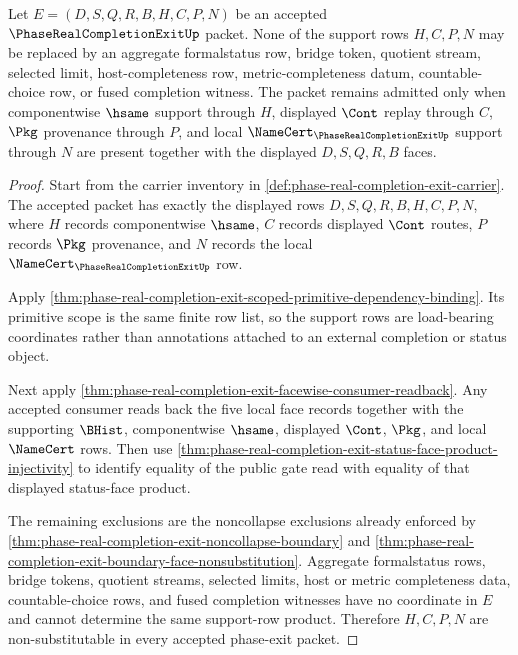 \begin{theorem}
\label{thm:phase-real-completion-exit-support-row-nonsubstitution}
Let $E=(D,S,Q,R,B,H,C,P,N)$ be an accepted $\PhaseRealCompletionExitUp$ packet. None of the support rows $H,C,P,N$ may be replaced by an aggregate formalstatus row, bridge token, quotient stream, selected limit, host-completeness row, metric-completeness datum, countable-choice row, or fused completion witness. The packet remains admitted only when componentwise $\hsame$ support through $H$, displayed $\Cont$ replay through $C$, $\Pkg$ provenance through $P$, and local $\NameCert_{\PhaseRealCompletionExitUp}$ support through $N$ are present together with the displayed $D,S,Q,R,B$ faces.
\end{theorem}
\begin{proof}
Start from the carrier inventory in \autoref{def:phase-real-completion-exit-carrier}. The accepted packet has exactly the displayed rows $D,S,Q,R,B,H,C,P,N$, where $H$ records componentwise $\hsame$, $C$ records displayed $\Cont$ routes, $P$ records $\Pkg$ provenance, and $N$ records the local $\NameCert_{\PhaseRealCompletionExitUp}$ row.

Apply \autoref{thm:phase-real-completion-exit-scoped-primitive-dependency-binding}. Its primitive scope is the same finite row list, so the support rows are load-bearing coordinates rather than annotations attached to an external completion or status object.

Next apply \autoref{thm:phase-real-completion-exit-facewise-consumer-readback}. Any accepted consumer reads back the five local face records together with the supporting $\BHist$, componentwise $\hsame$, displayed $\Cont$, $\Pkg$, and local $\NameCert$ rows. Then use \autoref{thm:phase-real-completion-exit-status-face-product-injectivity} to identify equality of the public gate read with equality of that displayed status-face product.

The remaining exclusions are the noncollapse exclusions already enforced by \autoref{thm:phase-real-completion-exit-noncollapse-boundary} and \autoref{thm:phase-real-completion-exit-boundary-face-nonsubstitution}. Aggregate formalstatus rows, bridge tokens, quotient streams, selected limits, host or metric completeness data, countable-choice rows, and fused completion witnesses have no coordinate in $E$ and cannot determine the same support-row product. Therefore $H,C,P,N$ are non-substitutable in every accepted phase-exit packet.
\end{proof}

